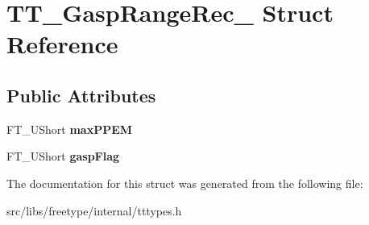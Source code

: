 \hypertarget{struct_t_t___gasp_range_rec__}{
\section{TT\_\-GaspRangeRec\_\- Struct Reference}
\label{struct_t_t___gasp_range_rec__}
}
\subsection*{Public Attributes}
\begin{DoxyCompactItemize}
\item 
\hypertarget{struct_t_t___gasp_range_rec___aa3fab31f6c0659b4deff402e210e15c9}{
FT\_\-UShort {\bfseries maxPPEM}}
\label{struct_t_t___gasp_range_rec___aa3fab31f6c0659b4deff402e210e15c9}

\item 
\hypertarget{struct_t_t___gasp_range_rec___a9fc298dc0e46d31507728ae25585118d}{
FT\_\-UShort {\bfseries gaspFlag}}
\label{struct_t_t___gasp_range_rec___a9fc298dc0e46d31507728ae25585118d}

\end{DoxyCompactItemize}


The documentation for this struct was generated from the following file:\begin{DoxyCompactItemize}
\item 
src/libs/freetype/internal/tttypes.h\end{DoxyCompactItemize}
